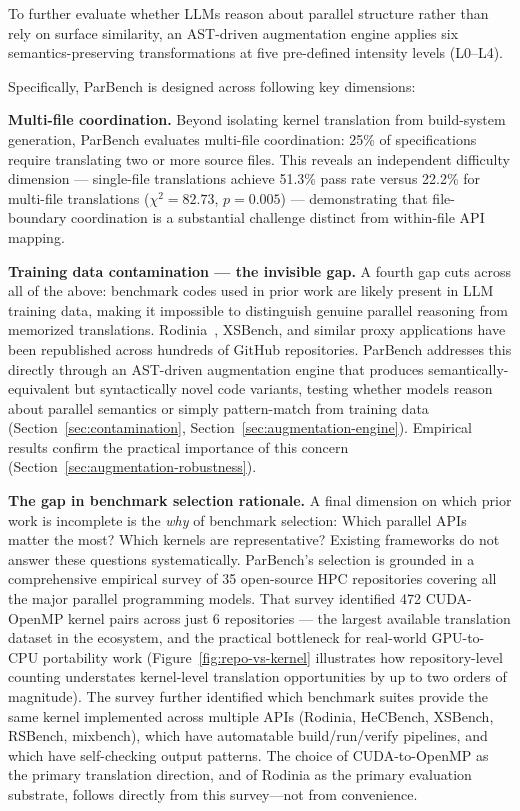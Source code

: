 To further evaluate whether LLMs reason about parallel structure rather than rely on surface similarity, an AST-driven augmentation engine applies six semantics-preserving transformations at five pre-defined intensity levels (L0--L4).

Specifically, ParBench is designed across following key dimensions:

\textbf{Multi-file coordination.} Beyond isolating kernel translation from build-system generation, ParBench evaluates multi-file coordination: 25\% of specifications require translating two or more source files. This reveals an independent difficulty dimension --- single-file translations achieve 51.3\% pass rate versus 22.2\% for multi-file translations ($\chi^2 = 82.73$, $p = 0.005$) --- demonstrating that file-boundary coordination is a substantial challenge distinct from within-file API mapping.

\textbf{Training data contamination --- the invisible gap.} A fourth gap cuts across all of the above: benchmark codes used in prior work are likely present in LLM training data, making it impossible to distinguish genuine parallel reasoning from memorized translations. Rodinia~\cite{Rodinia2009}, XSBench, and similar proxy applications have been republished across hundreds of GitHub repositories. ParBench addresses this directly through an AST-driven augmentation engine that produces semantically-equivalent but syntactically novel code variants, testing whether models reason about parallel semantics or simply pattern-match from training data (Section~\ref{sec:contamination}, Section~\ref{sec:augmentation-engine}). Empirical results confirm the practical importance of this concern (Section~\ref{sec:augmentation-robustness}).

\textbf{The gap in benchmark selection rationale.} A final dimension on which prior work is incomplete is the \emph{why} of benchmark selection: Which parallel APIs matter the most? Which kernels are representative? Existing frameworks do not answer these questions systematically. ParBench's selection is grounded in a comprehensive empirical survey of 35 open-source HPC repositories covering all the major parallel programming models. That survey identified 472 CUDA-OpenMP kernel pairs across just 6 repositories --- the largest available translation dataset in the ecosystem, and the practical bottleneck for real-world GPU-to-CPU portability work (Figure~\ref{fig:repo-vs-kernel} illustrates how repository-level counting understates kernel-level translation opportunities by up to two orders of magnitude). The survey further identified which benchmark suites provide the same kernel implemented across multiple APIs (Rodinia, HeCBench, XSBench, RSBench, mixbench), which have automatable build/run/verify pipelines, and which have self-checking output patterns. The choice of CUDA-to-OpenMP as the primary translation direction, and of Rodinia as the primary evaluation substrate, follows directly from this survey---not from convenience.

